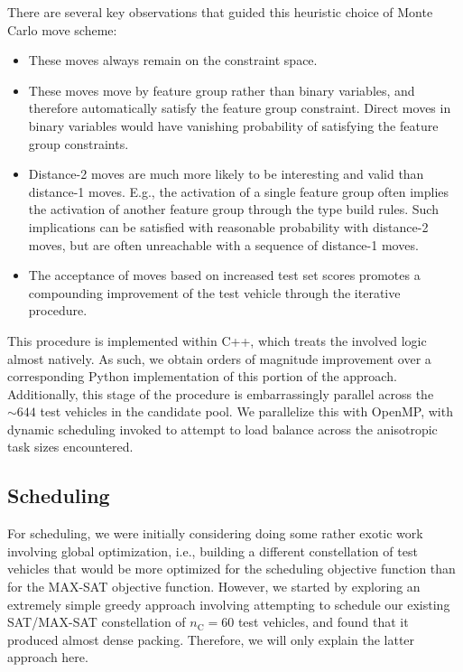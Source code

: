 \documentclass[aps,prl,twocolumn,superscriptaddress,groupedaddress]{revtex4}  %
\begin{document}
There are several key observations that guided this heuristic choice of Monte
Carlo move scheme:
\begin{itemize}
\item These moves always remain on the constraint space.
\item These moves move by feature group rather than binary variables, and
therefore automatically satisfy the feature group constraint. Direct moves in
binary variables would have vanishing probability of satisfying the feature
group constraints.
\item Distance-2 moves are much more likely to be interesting and valid than
distance-1 moves. E.g., the activation of a single feature group often implies
the activation of another feature group through the type build rules. Such
implications can be satisfied with reasonable probability with distance-2 moves,
but are often unreachable with a sequence of distance-1 moves.
\item The acceptance of moves based on increased test set scores promotes a
compounding improvement of the test vehicle through the iterative procedure.
\end{itemize}

This procedure is implemented within C++, which treats the involved logic almost
natively. As such, we obtain orders of magnitude improvement over a
corresponding Python implementation of this portion of the approach.
Additionally, this stage of the procedure is embarrassingly parallel across the
$\sim 644$ test vehicles in the candidate pool. We parallelize this with OpenMP,
with dynamic scheduling invoked to attempt to load balance across the
anisotropic task sizes encountered.


\subsection{Scheduling}

For scheduling, we were initially considering doing some rather exotic work
involving global optimization, i.e., building a different constellation of test
vehicles that would be more optimized for the scheduling objective function than
for the MAX-SAT objective function. However, we started by exploring an extremely
simple greedy approach involving attempting to schedule our existing SAT/MAX-SAT
constellation of $n_{\mathrm{C}} = 60$ test vehicles, and found that it produced
almost dense packing. Therefore, we will only explain the latter approach here. 
\end{document}
